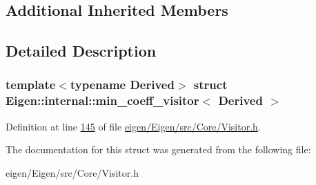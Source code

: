 \subsection*{Additional Inherited Members}


\subsection{Detailed Description}
\subsubsection*{template$<$typename Derived$>$\newline
struct Eigen\+::internal\+::min\+\_\+coeff\+\_\+visitor$<$ Derived $>$}



Definition at line \hyperlink{eigen_2_eigen_2src_2_core_2_visitor_8h_source_l00145}{145} of file \hyperlink{eigen_2_eigen_2src_2_core_2_visitor_8h_source}{eigen/\+Eigen/src/\+Core/\+Visitor.\+h}.



The documentation for this struct was generated from the following file\+:\begin{DoxyCompactItemize}
\item 
eigen/\+Eigen/src/\+Core/\+Visitor.\+h\end{DoxyCompactItemize}
